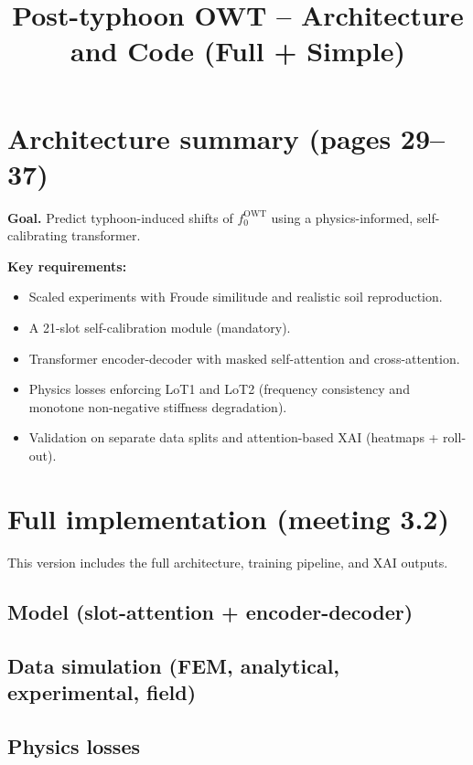 \documentclass[11pt]{article}
\title{Post-typhoon OWT -- Architecture and Code (Full + Simple)}
\author{}
\date{}
\begin{document}
\maketitle

\section{Architecture summary (pages 29--37)}
\textbf{Goal.} Predict typhoon-induced shifts of $f_0^{\mathrm{OWT}}$ using a physics-informed,
self-calibrating transformer.

\textbf{Key requirements:}
\begin{itemize}
  \item Scaled experiments with Froude similitude and realistic soil reproduction.
  \item A 21-slot self-calibration module (mandatory).
  \item Transformer encoder-decoder with masked self-attention and cross-attention.
  \item Physics losses enforcing LoT1 and LoT2 (frequency consistency and monotone
        non-negative stiffness degradation).
  \item Validation on separate data splits and attention-based XAI (heatmaps + roll-out).
\end{itemize}

\section{Full implementation (meeting 3.2)}
This version includes the full architecture, training pipeline, and XAI outputs.

\subsection{Model (slot-attention + encoder-decoder)}


\subsection{Data simulation (FEM, analytical, experimental, field)}


\subsection{Physics losses}

\end{document}
